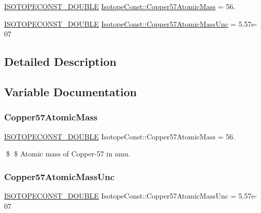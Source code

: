\begin{DoxyCompactItemize}
\item 
\mbox{\hyperlink{group___isotope_const-_macros_ga8f45a7272ce02c0b4c65c44636ed719a}{I\+S\+O\+T\+O\+P\+E\+C\+O\+N\+S\+T\+\_\+\+D\+O\+U\+B\+LE}} \mbox{\hyperlink{group___isotope_const-_copper-_cu57_ga87c41d93c633766f46fe4a7cbc4776b8}{Isotope\+Const\+::\+Copper57\+Atomic\+Mass}} = 56.
\item 
\mbox{\hyperlink{group___isotope_const-_macros_ga8f45a7272ce02c0b4c65c44636ed719a}{I\+S\+O\+T\+O\+P\+E\+C\+O\+N\+S\+T\+\_\+\+D\+O\+U\+B\+LE}} \mbox{\hyperlink{group___isotope_const-_copper-_cu57_ga67f9a090774d8e9b02eaf7c144c150b9}{Isotope\+Const\+::\+Copper57\+Atomic\+Mass\+Unc}} = 5.\+57e-\/07
\end{DoxyCompactItemize}


\subsection{Detailed Description}


\subsection{Variable Documentation}
\mbox{\label{group___isotope_const-_copper-_cu57_ga87c41d93c633766f46fe4a7cbc4776b8}} 
\subsubsection{\texorpdfstring{Copper57\+Atomic\+Mass}{Copper57AtomicMass}}
{\footnotesize\ttfamily \mbox{\hyperlink{group___isotope_const-_macros_ga8f45a7272ce02c0b4c65c44636ed719a}{I\+S\+O\+T\+O\+P\+E\+C\+O\+N\+S\+T\+\_\+\+D\+O\+U\+B\+LE}} Isotope\+Const\+::\+Copper57\+Atomic\+Mass = 56.}

\$ \$ Atomic mass of Copper-\/57 in amu. \mbox{\label{group___isotope_const-_copper-_cu57_ga67f9a090774d8e9b02eaf7c144c150b9}} 
\subsubsection{\texorpdfstring{Copper57\+Atomic\+Mass\+Unc}{Copper57AtomicMassUnc}}
{\footnotesize\ttfamily \mbox{\hyperlink{group___isotope_const-_macros_ga8f45a7272ce02c0b4c65c44636ed719a}{I\+S\+O\+T\+O\+P\+E\+C\+O\+N\+S\+T\+\_\+\+D\+O\+U\+B\+LE}} Isotope\+Const\+::\+Copper57\+Atomic\+Mass\+Unc = 5.\+57e-\/07}

